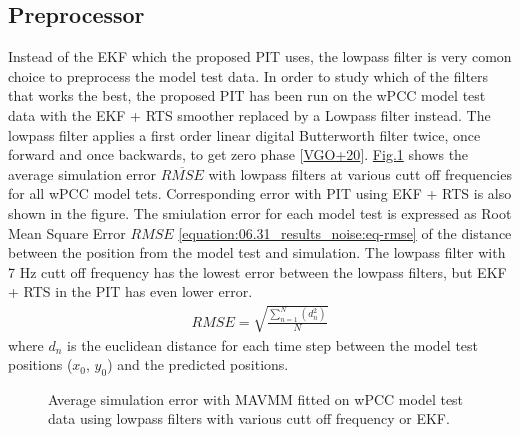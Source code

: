 \documentclass[review]{elsarticle}
\begin{document}
\subsection{Preprocessor}
\label{\detokenize{06.31_results_noise:preprocessor}}\label{\detokenize{06.31_results_noise::doc}}
\sphinxAtStartPar
Instead of the EKF which the proposed PIT uses, the low\sphinxhyphen{}pass filter is very comon choice to preprocess the model test data.
In order to study which of the filters that works the best, the proposed PIT has been run on the wPCC model test data with the EKF + RTS smoother replaced by a Low\sphinxhyphen{}pass filter instead. The lowpass filter applies a first order linear digital Butterworth filter twice, once forward and once backwards, to get zero phase {[}\hyperlink{cite.bibligraphy:id83}{VGO+20}{]}. \hyperref[\detokenize{06.31_results_noise:fig-lowpass-accuracy}]{Fig.\@ \ref{\detokenize{06.31_results_noise:fig-lowpass-accuracy}}} shows the average simulation error \( \overline{RMSE} \) with low\sphinxhyphen{}pass filters at various cutt off frequencies for all wPCC model tets. Corresponding error with PIT using EKF + RTS is also shown in the figure. The smiulation error for each model test is expressed as Root Mean Square Error \(RMSE\) \autoref{equation:06.31_results_noise:eq-rmse} of the distance between the position from the model test and simulation. The low\sphinxhyphen{}pass filter with 7 Hz cutt off frequency has the lowest error between the low\sphinxhyphen{}pass filters, but EKF + RTS in the PIT has even lower error.
\begin{equation}\label{equation:06.31_results_noise:eq_rmse}
\begin{split}RMSE=\sqrt{ \frac{\sum_{n=1}^{N} (d_n^2) }{N}} \end{split}
\end{equation}
\sphinxAtStartPar
where \(d_n\) is the euclidean distance for each time step between the model test positions (\(x_0\), \(y_0\)) and the predicted positions.

\begin{figure}[H]
\centering
\capstart

\noindent{}
\caption{Average simulation error with MAVMM fitted on wPCC model test data using low\sphinxhyphen{}pass filters with various cutt off frequency or EKF.}\label{\detokenize{06.31_results_noise:fig-lowpass-accuracy}}\end{figure}
\end{document}
